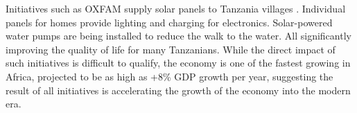 






Initiatives such as OXFAM supply solar panels to Tanzania villages \cite{oxfam}. Individual panels for homes provide lighting and charging for electronics. Solar-powered water pumps are being installed to reduce the walk to the water. All significantly improving the quality of life for many Tanzanians. While the direct impact of such initiatives is difficult to qualify, the economy is one of the fastest growing in Africa, projected to be as high as +8\% GDP growth per year, suggesting the result of all initiatives is accelerating the growth of the economy into the modern era.
